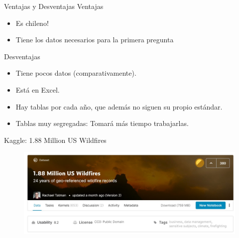 \begin{frame}{Ventajas y Desventajas}
    Ventajas
    \begin{itemize}
        \item[\ding{51}] Es chileno!
        \item[\ding{51}] Tiene los datos necesarios para la primera pregunta
    \end{itemize}
    
    Desventajas
    \begin{itemize}
        \item[\ding{55}] Tiene pocos datos (comparativamente).
        \item[\ding{55}] Está en Excel.
        \item[\ding{55}] Hay tablas por cada año, que además no siguen su propio estándar.
        \item[\ding{55}] Tablas muy segregadas: Tomará más tiempo trabajarlas.
    \end{itemize}
\end{frame}

\begin{frame}{Kaggle: 1.88 Million US Wildfires}
    \begin{figure}
        \centering
        \includegraphics[width=\textwidth]{presentaciones/img/06kaggle.jpg}
    \end{figure}
\end{frame}


